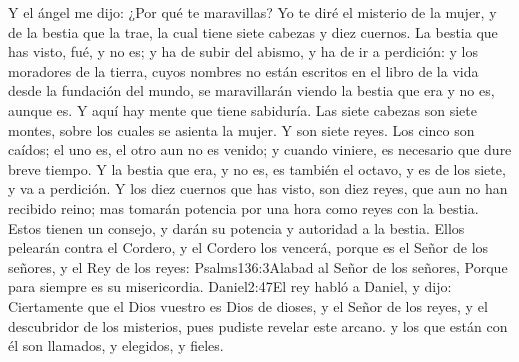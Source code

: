 Y el ángel me dijo: ¿Por qué te maravillas? Yo te diré el misterio de la mujer, y de la bestia que la trae, la cual tiene siete cabezas y diez cuernos. 
La bestia que has visto, fué, y no es; y ha de subir del abismo, y ha de ir a perdición: y los moradores de la tierra, cuyos nombres no están escritos en el libro de la vida desde la fundación del mundo, se maravillarán viendo la bestia que era y no es, aunque es. 
Y aquí hay mente que tiene sabiduría. Las siete cabezas son siete montes, sobre los cuales se asienta la mujer. 
Y son siete reyes. Los cinco son caídos; el uno es, el otro aun no es venido; y cuando viniere, es necesario que dure breve tiempo. 
Y la bestia que era, y no es, es también el octavo, y es de los siete, y va a perdición. 
Y los diez cuernos que has visto, son diez reyes,%
 que aun no han recibido reino; mas tomarán potencia por una hora como reyes con la bestia. 
Estos tienen un consejo, y darán su potencia y autoridad a la bestia. 
Ellos pelearán contra el Cordero, y el Cordero los vencerá, porque es el Señor de los señores, y el Rey de los reyes:%
				  {Psalms}{136:3}{Alabad al Señor de los señores, Porque para siempre es su misericordia.}%
				   {Daniel}{2:47}{El rey habló a Daniel, y dijo: Ciertamente que el Dios vuestro es Dios de dioses, y el Señor de los reyes, y el descubridor de los misterios, pues pudiste revelar este arcano.}
 y los que están con él son llamados, y elegidos, y fieles. 

